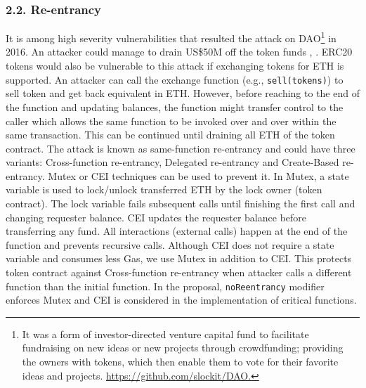\subsubsection*{2.2. Re-entrancy}
It is among high severity vulnerabilities that resulted the attack on DAO\footnote{It was a form of investor-directed venture capital fund to facilitate fundraising on new ideas or new projects through crowdfunding; providing the owners with tokens, which then enable them to vote for their favorite ideas and projects. \url{https://github.com/slockit/DAO.}} in 2016. An attacker could manage to drain US\$50M off the token funds \cite{DAO1}, \cite{DAO2}. ERC20 tokens would also be vulnerable to this attack if exchanging tokens for ETH is supported. An attacker can call the exchange function (e.g., \texttt{sell(tokens)}) to sell token and get back equivalent in ETH. However, before reaching to the end of the function and updating balances, the function might transfer control to the caller which allows the same function to be invoked over and over within the same transaction. This can be continued until draining all ETH of the token contract. The attack is known as same-function re-entrancy and could have three variants: Cross-function re-entrancy, Delegated re-entrancy and Create-Based re-entrancy\cite{SEREUM}. Mutex\cite{WiKiMutex} or CEI\cite{SolidtyDocSec} techniques can be used to prevent it. In Mutex, a state variable is used to lock/unlock transferred ETH by the lock owner (\ie token contract). The lock variable fails subsequent calls until finishing the first call and changing requester balance. CEI updates the requester balance before transferring any fund. All interactions (\ie external calls) happen at the end of the function and prevents recursive calls. Although CEI does not require a state variable and consumes less Gas, we use Mutex in addition to CEI. This protects token contract against Cross-function re-entrancy when attacker calls a different function than the initial function. In the proposal, \texttt{noReentrancy} modifier enforces Mutex and CEI is considered in the implementation of critical functions.

